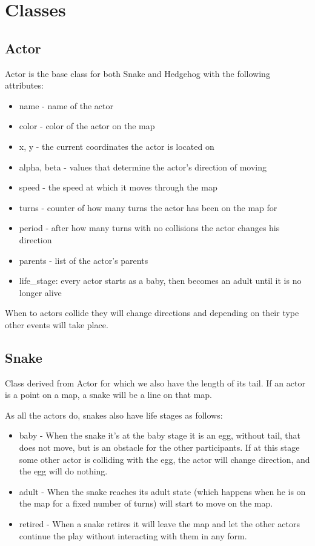 \chapter{Classes}
\label{chap:objectives}

\section{\Large Actor}
    Actor is the base class for both Snake and Hedgehog with the following attributes:
    \begin{itemize}
        \item name - name of the actor
        \item color - color of the actor on the map
        \item x, y - the current coordinates the actor is located on
        \item alpha, beta - values that determine the actor's direction of moving
        \item speed - the speed at which it moves through the map
        \item turns - counter of how many turns the actor has been on the map for
        \item period - after how many turns with no collisions the actor changes his direction
        \item parents - list of the actor's parents
        \item life\_stage: every actor starts as a baby, then becomes an adult until it is no longer alive
    \end{itemize}
    
    When to actors collide they will change directions and depending on their type other events will take place.

\section{\Large Snake}
    Class derived from Actor for which we also have the length of its tail. If an actor is a point on a map, a snake will be a line on that map.
    
    
    As all the actors do, snakes also have life stages as follows: 
    \begin{itemize}
        \item {baby - When the snake it's at the baby stage it is an egg, without tail, that does not move, but is an obstacle for the other participants. If at this stage some other actor is colliding with the egg, the actor will change direction, and the egg will do nothing.}
        \item {adult - When the snake reaches its adult state (which happens when he is on the map for a fixed number of turns) will start to move on the map.}
        \item {retired - When a snake retires it will leave the map and let the other actors continue the play without interacting with them in any form.}
    \end{itemize}


